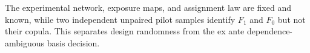 The experimental network, exposure maps, and assignment law are fixed and known, while two independent unpaired pilot samples identify \(F_1\) and \(F_0\) but not their copula.  This separates design randomness from the ex ante dependence-ambiguous basis decision.